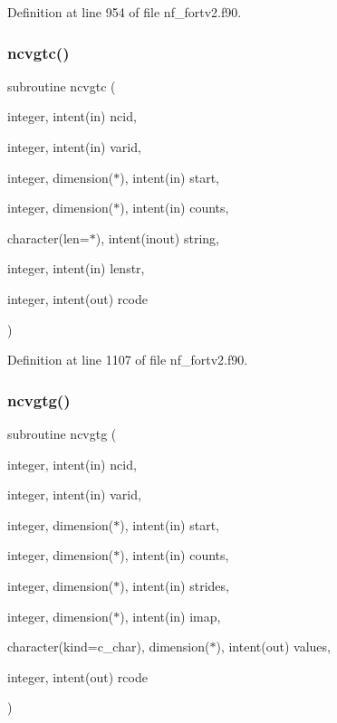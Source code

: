 Definition at line 954 of file nf\+\_\+fortv2.\+f90.

\mbox{\label{nf__fortv2_8f90_a81ac17ea93b907a54fc2557bf3ace40a}} 
\subsubsection{\texorpdfstring{ncvgtc()}{ncvgtc()}}
{\footnotesize\ttfamily subroutine ncvgtc (\begin{DoxyParamCaption}\item[{integer, intent(in)}]{ncid,  }\item[{integer, intent(in)}]{varid,  }\item[{integer, dimension($\ast$), intent(in)}]{start,  }\item[{integer, dimension($\ast$), intent(in)}]{counts,  }\item[{character(len=$\ast$), intent(inout)}]{string,  }\item[{integer, intent(in)}]{lenstr,  }\item[{integer, intent(out)}]{rcode }\end{DoxyParamCaption})}



Definition at line 1107 of file nf\+\_\+fortv2.\+f90.

\mbox{\label{nf__fortv2_8f90_ae0fbe2588278893dcab19ab604767a7d}} 
\subsubsection{\texorpdfstring{ncvgtg()}{ncvgtg()}}
{\footnotesize\ttfamily subroutine ncvgtg (\begin{DoxyParamCaption}\item[{integer, intent(in)}]{ncid,  }\item[{integer, intent(in)}]{varid,  }\item[{integer, dimension($\ast$), intent(in)}]{start,  }\item[{integer, dimension($\ast$), intent(in)}]{counts,  }\item[{integer, dimension($\ast$), intent(in)}]{strides,  }\item[{integer, dimension($\ast$), intent(in)}]{imap,  }\item[{character(kind=c\+\_\+char), dimension($\ast$), intent(out)}]{values,  }\item[{integer, intent(out)}]{rcode }\end{DoxyParamCaption})}



